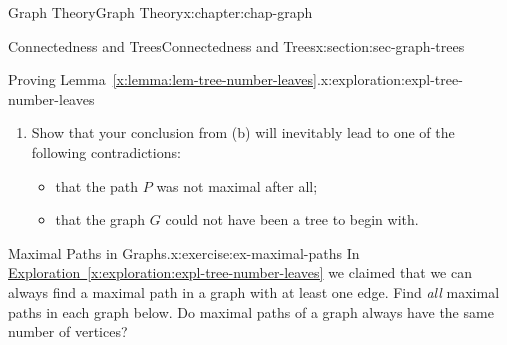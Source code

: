 \documentclass[oneside,10pt,]{book}
\newcommand{\xreffont}{\relax}
\numberwithin{equation}{section}
\begin{document}
\begin{chapterptx}{Graph Theory}{}{Graph Theory}{}{}{x:chapter:chap-graph}
\begin{sectionptx}{Connectedness and Trees}{}{Connectedness and Trees}{}{}{x:section:sec-graph-trees}
\begin{exploration}{Proving Lemma~{\xreffont\ref*{x:lemma:lem-tree-number-leaves}}.}{x:exploration:expl-tree-number-leaves}
\begin{enumerate}[font=\bfseries,label=(\alph*),ref=\alph*]
\begin{sidebyside}{1}{0.3}{0.3}{0}
\begin{sbspanel}{0.4}%
%
\end{sbspanel}%
\end{sidebyside}%
\par
Given the assumption that \(G\) has fewer than two leaves, what can we conclude about \(x_1\) and \(x_k\)? (Hint: what about their degrees?)%
\item{}Show that your conclusion from (b) will inevitably lead to one of the following contradictions:%
\begin{itemize}[label=\textbullet]
\item{}that the path \(P\) was not maximal after all;%
\item{}that the graph \(G\) could not have been a tree to begin with.%
\end{itemize}
%
\end{enumerate}
\end{exploration}%
\begin{inlineexercise}{Maximal Paths in Graphs.}{x:exercise:ex-maximal-paths}%
In \hyperref[x:exploration:expl-tree-number-leaves]{Exploration~{\xreffont\ref{x:exploration:expl-tree-number-leaves}}} we claimed that we can always find a maximal path in a graph with at least one edge. Find \emph{all} maximal paths in each graph below. Do maximal paths of a graph always have the same number of vertices?%
\begin{sidebyside}{4}{0.045}{0.045}{0.09}%

\end{sidebyside}
\end{inlineexercise}
\end{sectionptx}
\end{chapterptx}
\end{document}
